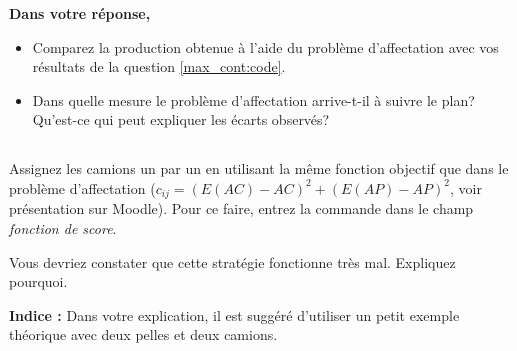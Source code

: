 \vspace{10pt}
\noindent\textbf{Dans votre réponse,}  

\begin{itemize}
	\item Comparez la production obtenue à l'aide du problème d'affectation avec vos résultats de la question \ref{max_cont:code}.
	\item Dans quelle mesure le problème d'affectation arrive-t-il à suivre le plan? Qu'est-ce qui peut expliquer les écarts observés? 
\end{itemize}



\subsection{} 


Assignez les camions un par un en utilisant la même fonction objectif que dans le problème d'affectation ($c_{ij} = \left(E(AC)-AC\right)^2 + \left(E(AP)-AP\right)^2$, voir présentation sur Moodle). Pour ce faire, entrez la commande  dans le champ \textit{fonction de score}. 

\noindent Vous devriez constater que cette stratégie fonctionne très mal. Expliquez pourquoi.

\noindent\textbf{Indice : }Dans votre explication, il est suggéré d'utiliser un petit exemple théorique avec deux pelles et deux camions.


